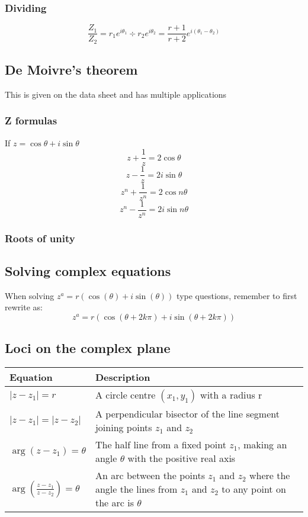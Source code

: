 \documentclass{article}[18pt]
\begin{document}
\subsubsection{Dividing}
$$\frac{Z_1}{Z_2}=r_1e^{i\theta_1}\div r_2e^{i\theta_2}=\frac{r+1}{r+2} e^{i(\theta_1-\theta_2)}$$
\subsection{De Moivre's theorem}
This is given on the data sheet and has multiple applications
\subsubsection{Z formulas}
If $z=\cos\theta+i\sin\theta$
$$z+\frac{1}{z}=2\cos\theta$$
$$z-\frac{1}{z}=2i\sin\theta$$
$$z^n+\frac{1}{z^n}=2\cos n\theta$$
$$z^n-\frac{1}{z^n}=2i\sin n\theta$$
\subsubsection{Roots of unity}

\subsection{Solving complex equations}
When solving $z^a=r(\cos(\theta)+i\sin(\theta))$ type questions, remember to first rewrite as:
$$z^a=r(\cos(\theta+2k\pi)+i\sin(\theta+2k\pi))$$


\subsection{Loci on the complex plane}
\begin{tabularx}{\textwidth}{|X|X|}
\hline
Equation&Description\\
\hline
{\Large$|z-z_1|=r$}&A circle centre $(x_1,y_1)$ with a radius r\\
\hline
{\Large$|z-z_1|=|z-z_2|$}&A perpendicular bisector of the line segment joining points $z_1$ and $z_2$\\
\hline
{\Large$\arg(z-z_1)=\theta$}&The half line from a fixed point $z_1$, making an angle $\theta$ with the positive real axis\\
\hline
{\Large$\arg(\frac{z-z_1}{z-z_2})=\theta$}&An arc between the points $z_1$ and $z_2$ where the angle the lines from $z_1$ and $z_2$ to any point on the arc is $\theta$\\
\hline
\end{tabularx}
\end{document}
